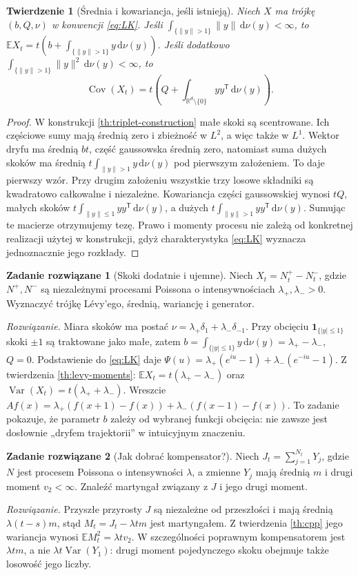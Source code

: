 \documentclass[11pt,a4paper,oneside]{report}
\numberwithin{equation}{chapter}
\theoremstyle{plain}
\newtheorem{twierdzenie}{Twierdzenie}[chapter]
\theoremstyle{definition}
\newtheorem{zadanie}{Zadanie rozwiązane}[chapter]
\theoremstyle{remark}
\newcommand{\R}{\mathbb{R}}
\newcommand{\E}{\mathbb{E}}
\newcommand{\Var}{\operatorname{Var}}
\newcommand{\ind}[1]{\mathbf{1}_{#1}}
\newcommand{\dd}{\mathrm{d}}
\begin{document}
\begin{twierdzenie}[Średnia i kowariancja, jeśli istnieją]\label{thm:volIII:10:07}
\label{th:levy-moments}
Niech $X$ ma trójkę $(b,Q,\nu)$ w konwencji
\eqref{eq:LK}. Jeśli
$\int_{\{\|y\|>1\}}\|y\|\,\dd\nu(y)<\infty$,
to $\E X_t=t(b+\int_{\{\|y\|>1\}}y\,\dd\nu(y))$.
Jeśli dodatkowo
$\int_{\{\|y\|>1\}}\|y\|^2\,\dd\nu(y)<\infty$,
to
\[
\operatorname{Cov}(X_t)
=t\left(Q+\int_{\R^d\setminus\{0\}}yy^{\mathsf T}\,\dd\nu(y)\right).
\]
\end{twierdzenie}
\begin{proof}
W konstrukcji \ref{th:triplet-construction} małe skoki są
scentrowane. Ich częściowe sumy mają średnią zero i
zbieżność w $L^2$, a więc także w $L^1$.
Wektor dryfu ma średnią $bt$, część gaussowska średnią
zero, natomiast suma dużych skoków ma średnią
$t\int_{\|y\|>1}y\,\dd\nu(y)$ pod pierwszym
założeniem. To daje pierwszy wzór.
Przy drugim założeniu wszystkie trzy losowe składniki
są kwadratowo całkowalne i niezależne. Kowariancja
części gaussowskiej wynosi $tQ$, małych skoków
$t\int_{\|y\|\le1}yy^{\mathsf T}\,\dd\nu(y)$,
a dużych $t\int_{\|y\|>1}yy^{\mathsf T}\,\dd\nu(y)$.
Sumując te macierze otrzymujemy tezę.
Prawo i momenty procesu nie zależą od konkretnej
realizacji użytej w konstrukcji, gdyż charakterystyka
\eqref{eq:LK} wyznacza jednoznacznie jego rozkłady.
\end{proof}

\begin{zadanie}[Skoki dodatnie i ujemne]
Niech $X_t=N_t^+-N_t^-$, gdzie $N^+,N^-$ są niezależnymi
procesami Poissona o intensywnościach $\lambda_+,\lambda_->0$.
Wyznaczyć trójkę Lévy'ego, średnią, wariancję i generator.

\emph{Rozwiązanie.} Miara skoków ma postać
$\nu=\lambda_+\delta_1+\lambda_-\delta_{-1}$.
Przy obcięciu $\ind{\{|y|\le1\}}$ skoki $\pm1$
są traktowane jako małe, zatem
$b=\int_{\{|y|\le1\}}y\,\dd\nu(y)=\lambda_+-\lambda_-$,
$Q=0$. Podstawienie do \eqref{eq:LK} daje
$\Psi(u)=\lambda_+(e^{iu}-1)+\lambda_-(e^{-iu}-1)$.
Z twierdzenia \ref{th:levy-moments}:
$\E X_t=t(\lambda_+-\lambda_-)$ oraz
$\Var(X_t)=t(\lambda_++\lambda_-)$. Wreszcie
$Af(x)=\lambda_+(f(x+1)-f(x))+
\lambda_-(f(x-1)-f(x))$.
To zadanie pokazuje, że parametr $b$ zależy od wybranej
funkcji obcięcia: nie zawsze jest dosłownie „dryfem
trajektorii” w intuicyjnym znaczeniu.
\end{zadanie}

\begin{zadanie}[Jak dobrać kompensator?]
Niech $J_t=\sum_{j=1}^{N_t}Y_j$, gdzie
$N$ jest procesem Poissona o intensywności $\lambda$,
a zmienne $Y_j$ mają średnią $m$ i drugi moment $v_2<\infty$.
Znaleźć martyngał związany z $J$ i jego drugi moment.

\emph{Rozwiązanie.} Przyszłe przyrosty $J$ są
niezależne od przeszłości i mają średnią
$\lambda(t-s)m$, stąd
$M_t=J_t-\lambda tm$ jest martyngałem.
Z twierdzenia \ref{th:cpp} jego wariancja wynosi
$\E M_t^2=\lambda tv_2$.
W szczególności poprawnym kompensatorem jest
$\lambda tm$, a nie $\lambda t\Var(Y_1)$:
drugi moment pojedynczego skoku obejmuje także losowość
jego liczby.
\end{zadanie}
\end{document}
